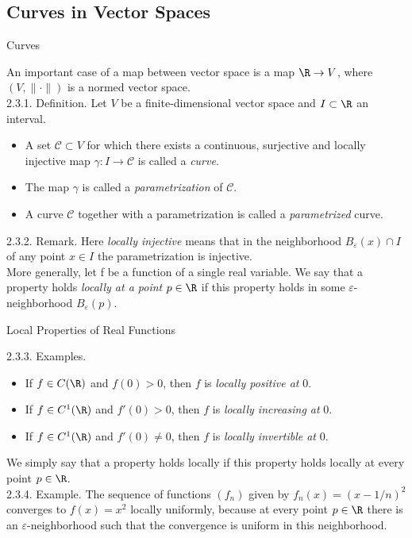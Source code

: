\documentclass[smaller,hyperref={CJKbookmarks=true}]{beamer}
\begin{document}
\subsection{Curves in Vector Spaces}
\begin{frame}[c]
\begin{spacing}{2.5}
\tableofcontents[sectionstyle=hide,subsectionstyle=show/shaded/hide]
\end{spacing}
\end{frame}
\begin{frame}[t]{Curves}
\begin{spacing}{1}
An important case of a map between vector space is a map $\R\to V$, where $(V,\|\cdot\|)$ is a normed vector space.\\[4pt]
\alert{2.3.1. Definition.} Let $V$ be a finite-dimensional vector space and $I\subset\R$ an interval.
\begin{itemize}
  \item A set $\mathcal{C}\subset V$ for which there exists a continuous, surjective and locally injective map $\gamma:I\to\mathcal{C}$ is called a \emph{curve}.
  \item The map $\gamma$ is called a \emph{parametrization} of $\mathcal{C}$.
  \item A curve $\mathcal{C}$ together with a parametrization is called a \emph{parametrized} curve.
\end{itemize}
\vspace*{12pt}
\alert{2.3.2. Remark.} Here \emph{locally injective} means that in the neighborhood $B_{\varepsilon}(x)\cap I$ of any point $x\in I$ the parametrization is injective.\\[5pt]
More generally, let f be a function of a single real variable. We say that a
property holds \emph{locally at a point} $p\in\R$ if this property holds in some $\varepsilon$-neighborhood $B_{\varepsilon}(p)$.
\end{spacing}
\end{frame}
\begin{frame}[c]{Local Properties of Real Functions}
\begin{spacing}{1.1}
\alert{2.3.3. Examples.}
\begin{itemize}
  \item If $f\in C(\R)$ and $f(0)>0$, then $f$ is \emph{locally positive at} 0.
  \item If $f\in C^1(\R)$ and $f'(0)>0$, then $f$ is \emph{locally increasing at} 0.
  \item If $f\in C^1(\R)$ and $f'(0)\neq0$, then $f$ is \emph{locally invertible at} 0.
\end{itemize}
We simply say that a property holds locally if this property holds locally at
every point $p\in\R$.\\[5pt]
\alert{2.3.4. Example.} The sequence of functions $(f_n)$ given by $f_n(x)=(x-1/n)^2$ converges to $f(x)=x^2$ locally uniformly, because at every point $p\in\R$ there is an $\varepsilon$-neighborhood such that the convergence is uniform in this neighborhood.
\end{spacing}
\end{frame}
\end{document}
